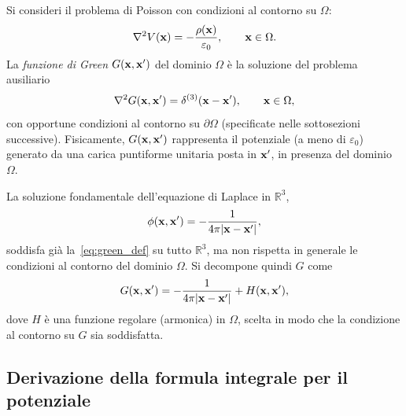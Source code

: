 Si consideri il problema di Poisson con condizioni al contorno su $\Omega$:
\begin{equation}\label{eq:poisson}
    \nabla^2 V(\mathbf{x}) = -\frac{\rho(\mathbf{x})}{\varepsilon_0}, \qquad
    \mathbf{x} \in \Omega.
\end{equation}
La \emph{funzione di Green} $G(\mathbf{x}, \mathbf{x}')$ del dominio $\Omega$ è la soluzione del
problema ausiliario
\begin{equation}\label{eq:green_def}
    \nabla^2 G(\mathbf{x}, \mathbf{x}') = \delta^{(3)}(\mathbf{x} - \mathbf{x}'), \qquad \mathbf{x} \in \Omega,
\end{equation}
con opportune condizioni al contorno su $\partial\Omega$ (specificate nelle
sottosezioni successive). Fisicamente, $G(\mathbf{x},\mathbf{x}')$ rappresenta il potenziale
(a meno di $\varepsilon_0$) generato da una carica puntiforme unitaria posta in
$\mathbf{x}'$, in presenza del dominio $\Omega$.

La soluzione fondamentale dell'equazione di Laplace in $\mathbb{R}^3$,
\begin{equation}
    \phi(\mathbf{x}, \mathbf{x}') = -\frac{1}{4\pi |\mathbf{x} - \mathbf{x}'|},
\end{equation}
soddisfa già la~\eqref{eq:green_def} su tutto $\mathbb{R}^3$, ma non rispetta in
generale le condizioni al contorno del dominio $\Omega$.
Si decompone quindi $G$ come
\begin{equation}
    G(\mathbf{x}, \mathbf{x}') = -\frac{1}{4\pi|\mathbf{x}-\mathbf{x}'|} + H(\mathbf{x}, \mathbf{x}'),
\end{equation}
dove $H$ è una funzione regolare (armonica) in $\Omega$, scelta in modo che la
condizione al contorno su $G$ sia soddisfatta.

\subsection{Derivazione della formula integrale per il potenziale}

